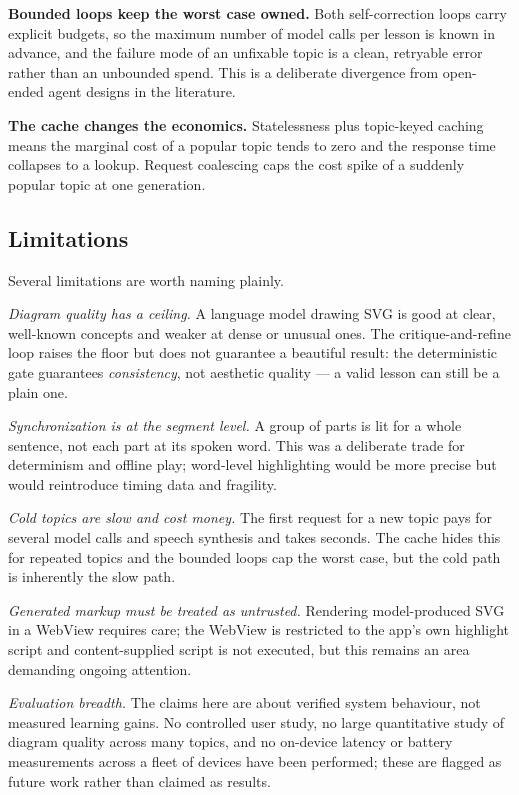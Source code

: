 \textbf{Bounded loops keep the worst case owned.} Both self-correction loops
carry explicit budgets, so the maximum number of model calls per lesson is
known in advance, and the failure mode of an unfixable topic is a clean,
retryable error rather than an unbounded spend. This is a deliberate
divergence from open-ended agent designs in the literature.

\textbf{The cache changes the economics.} Statelessness plus topic-keyed
caching means the marginal cost of a popular topic tends to zero and the
response time collapses to a lookup. Request coalescing caps the cost spike
of a suddenly popular topic at one generation.

\subsection{Limitations}

Several limitations are worth naming plainly.

\emph{Diagram quality has a ceiling.} A language model drawing SVG is good
at clear, well-known concepts and weaker at dense or unusual ones. The
critique-and-refine loop raises the floor but does not guarantee a beautiful
result: the deterministic gate guarantees \emph{consistency}, not aesthetic
quality --- a valid lesson can still be a plain one.

\emph{Synchronization is at the segment level.} A group of parts is lit for
a whole sentence, not each part at its spoken word. This was a deliberate
trade for determinism and offline play; word-level highlighting would be
more precise but would reintroduce timing data and fragility.

\emph{Cold topics are slow and cost money.} The first request for a new
topic pays for several model calls and speech synthesis and takes seconds.
The cache hides this for repeated topics and the bounded loops cap the worst
case, but the cold path is inherently the slow path.

\emph{Generated markup must be treated as untrusted.} Rendering
model-produced SVG in a WebView requires care; the WebView is restricted to
the app's own highlight script and content-supplied script is not executed,
but this remains an area demanding ongoing attention.

\emph{Evaluation breadth.} The claims here are about verified system
behaviour, not measured learning gains. No controlled user study, no large
quantitative study of diagram quality across many topics, and no on-device
latency or battery measurements across a fleet of devices have been
performed; these are flagged as future work rather than claimed as results.
